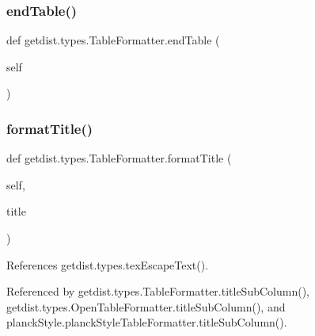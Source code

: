 \subsubsection{\texorpdfstring{end\+Table()}{endTable()}}
{\footnotesize\ttfamily def getdist.\+types.\+Table\+Formatter.\+end\+Table (\begin{DoxyParamCaption}\item[{}]{self }\end{DoxyParamCaption})}

\mbox{\label{classgetdist_1_1types_1_1TableFormatter_ab69b39cc3ea77c19e14235dee84964a4}} 
\subsubsection{\texorpdfstring{format\+Title()}{formatTitle()}}
{\footnotesize\ttfamily def getdist.\+types.\+Table\+Formatter.\+format\+Title (\begin{DoxyParamCaption}\item[{}]{self,  }\item[{}]{title }\end{DoxyParamCaption})}



References getdist.\+types.\+tex\+Escape\+Text().



Referenced by getdist.\+types.\+Table\+Formatter.\+title\+Sub\+Column(), getdist.\+types.\+Open\+Table\+Formatter.\+title\+Sub\+Column(), and planck\+Style.\+planck\+Style\+Table\+Formatter.\+title\+Sub\+Column().

